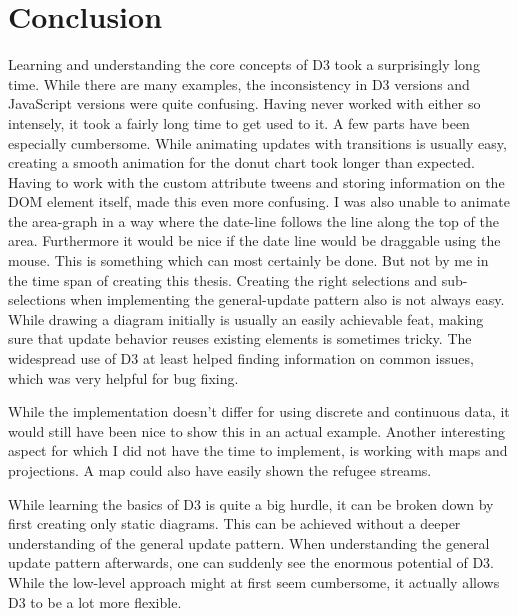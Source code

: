 \chapter{Conclusion}

Learning and understanding the core concepts of D3 took a surprisingly long time. While there are many examples, the inconsistency in D3 versions and JavaScript versions were quite confusing. Having never worked with either so intensely, it took a fairly long time to get used to it. A few parts have been especially cumbersome. While animating updates with transitions is usually easy, creating a smooth animation for the donut chart took longer than expected. Having to work with the custom attribute tweens and storing information on the DOM element itself, made this even more confusing. I was also unable to animate the area-graph in a way where the date-line follows the line along the top of the area. Furthermore it would be nice if the date line would be draggable using the mouse. This is something which can most certainly be done. But not by me in the time span of creating this thesis. Creating the right selections and sub-selections when implementing the general-update pattern also is not always easy. While drawing a diagram initially is usually an easily achievable feat, making sure that update behavior reuses existing elements is sometimes tricky. The widespread use of D3 at least helped finding information on common issues, which was very helpful for bug fixing.

While the implementation doesn't differ for using discrete and continuous data, it would still have been nice to show this in an actual example. Another interesting aspect for which I did not have the time to implement, is working with maps and projections. A map could also have easily shown the refugee streams.

While learning the basics of D3 is quite a big hurdle, it can be broken down by first creating only static diagrams. This can be achieved without a deeper understanding of the general update pattern. When understanding the general update pattern afterwards, one can suddenly see the enormous potential of D3. While the low-level approach might at first seem cumbersome, it actually allows D3 to be a lot more flexible. 

